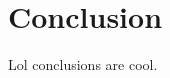 \documentclass[journal,twocolumn]{IEEEtran}
\begin{document}
\section{Conclusion}

Lol conclusions are cool.



%

%
\end{document}
